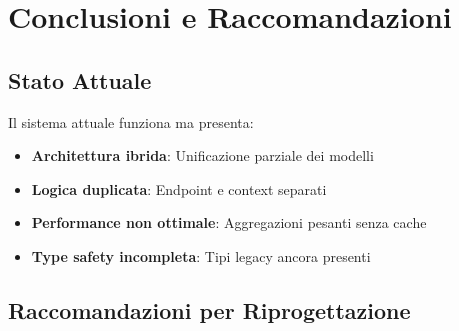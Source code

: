 \documentclass[11pt,a4paper]{article}
\begin{document}
\newpage

\section{Conclusioni e Raccomandazioni}

\subsection{Stato Attuale}

Il sistema attuale funziona ma presenta:
\begin{itemize}
    \item \textbf{Architettura ibrida}: Unificazione parziale dei modelli
    \item \textbf{Logica duplicata}: Endpoint e context separati
    \item \textbf{Performance non ottimale}: Aggregazioni pesanti senza cache
    \item \textbf{Type safety incompleta}: Tipi legacy ancora presenti
\end{itemize}

\subsection{Raccomandazioni per Riprogettazione}
\end{document}
